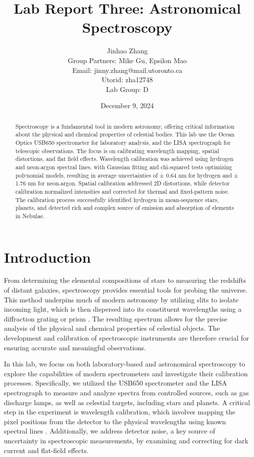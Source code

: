 \documentclass[10pt, preprint]{aastex}
\title{Lab Report Three: Astronomical Spectroscopy}
\author{
Jinhao Zhang \\
Group Partners: Mike Gu, Epsilon Mao \\
Email: jinny.zhang@mail.utoronto.ca \\
Utorid: zha12748 \\
Lab Group: D \\
}
\date{\centering December 9, 2024}
\begin{document}
\begin{abstract}
Spectroscopy is a fundamental tool in modern astronomy, offering critical information about the physical and chemical properties of celestial bodies. This lab use the Ocean Optics USB650 spectrometer for laboratory analysis, and the LISA spectrograph for telescopic observations. The focus is on calibrating wavelength mapping, spatial distortions, and flat field effects. Wavelength calibration was achieved using hydrogen and neon-argon spectral lines, with Gaussian fitting and chi-squared tests optimizing polynomial models, resulting in average uncertainties of ± 0.64 nm for hydrogen and ± 1.76 nm for neon-argon. Spatial calibration addressed 2D distortions, while detector calibration normalized intensities and corrected for thermal and fixed-pattern noise. The calibration process successfully identified hydrogen in mean-sequence stars, planets, and detected rich and complex source of emission and absorption of elements in Nebulae. 

\end{abstract}

\maketitle
\section{Introduction}
From determining the elemental compositions of stars to measuring the redshifts of distant galaxies, spectroscopy provides essential tools for probing the universe. This method underpins much of modern astronomy by utilizing slits to isolate incoming light, which is then dispersed into its constituent wavelengths using a diffraction grating or prism \cite{ast325lecture9}. The resulting spectrum allows for the precise analysis of the physical and chemical properties of celestial objects. The development and calibration of spectroscopic instruments are therefore crucial for ensuring accurate and meaningful observations.

In this lab, we focus on both laboratory-based and astronomical spectroscopy to explore the capabilities of modern spectrometers and investigate their calibration processes. Specifically, we utilized the USB650 spectrometer and the LISA spectrograph to measure and analyze spectra from controlled sources, such as gas discharge lamps, as well as celestial targets, including stars and planets. A critical step in the experiment is wavelength calibration, which involves mapping the pixel positions from the detector to the physical wavelengths using known spectral lines \cite{labmanual3}. Additionally, we address detector noise, a key source of uncertainty in spectroscopic measurements, by examining and correcting for dark current and flat-field effects.
\end{document}
